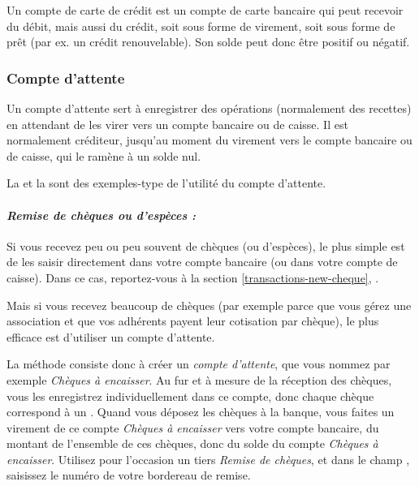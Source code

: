 Un compte de carte de crédit est un compte de carte bancaire qui peut recevoir du débit, mais aussi du crédit, soit sous forme de virement, soit sous forme de prêt (par ex. un crédit renouvelable). Son solde peut donc être positif ou négatif.


\subsubsection{Compte d'attente\label{accounts-type-bank-waiting}}

Un compte d'attente sert à enregistrer des opérations (normalement des recettes) en attendant de les virer vers un compte bancaire ou de caisse. Il est normalement créditeur, jusqu'au moment du virement vers le compte bancaire ou de caisse, qui le ramène à un solde nul.

La  et la  sont des exemples-type de l'utilité du compte d'attente. 
 
\paragraph{\textsl{Remise de chèques ou d'espèces  :}\label{accounts-type-bank-waiting-remittance}}

Si vous recevez peu ou peu souvent de chèques (ou d'espèces), le plus simple est de les saisir directement dans votre compte bancaire (ou dans votre compte de caisse). Dans ce cas, reportez-vous à la section \vref{transactions-new-cheque}, .

Mais si vous recevez beaucoup de chèques (par exemple parce que vous gérez une association et que vos adhérents payent leur cotisation par chèque), le plus efficace est d'utiliser un compte d'attente.

La méthode consiste donc à créer un \emph{compte d'attente}, que vous nommez par exemple \emph{Chèques à encaisser}. Au fur et à mesure de la réception des chèques, vous les enregistrez individuellement dans ce compte, donc chaque chèque correspond à un . Quand vous déposez les chèques à la banque, vous faites un virement de ce compte \emph{Chèques à encaisser} vers votre compte bancaire, du montant de l'ensemble de ces chèques, donc du solde du compte \emph{Chèques à encaisser}. Utilisez pour l'occasion un tiers \emph{Remise de chèques}, et dans le champ , saisissez le numéro de votre bordereau de remise.

